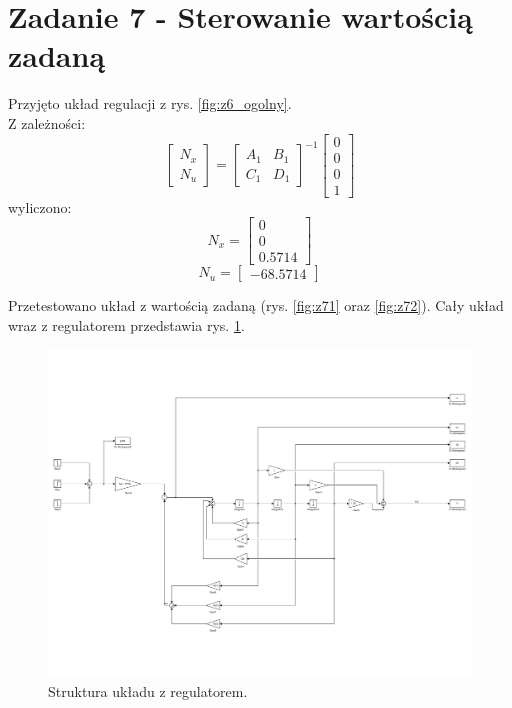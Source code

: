 \documentclass{article}
\begin{document}
\section{Zadanie 7 - Sterowanie wartością zadaną}
Przyjęto układ regulacji z rys. \ref{fig:z6_ogolny}. \\
Z zależności:
\[ \begin{bmatrix} N_x \\ N_u \end{bmatrix}
= \begin{bmatrix} A_1 & B_1 \\ C_1 & D_1 \end{bmatrix}^{-1}\begin{bmatrix}0\\0\\0\\1 \end{bmatrix}\]
wyliczono:
\[N_x = \begin{bmatrix}0 \\ 0\\0.5714\end{bmatrix}\]
\[N_u = \begin{bmatrix}-68.5714\end{bmatrix}\]

Przetestowano układ z wartością zadaną (rys. \ref{fig:z71} oraz \ref{fig:z72}). Cały układ wraz z regulatorem przedstawia rys. \ref{fig:z7}.

\begin{figure}[H]
\centering
\includegraphics[width=0.9\linewidth]{z7}
\caption{Struktura układu z regulatorem.}
\label{fig:z7}
\end{figure}
\end{document}
